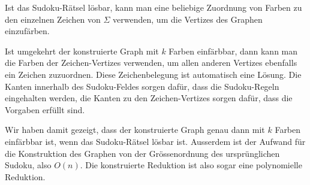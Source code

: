 \begin{loesung}
Ist das Sudoku-Rätsel lösbar, kann man eine beliebige
Zuordnung von Farben zu den einzelnen Zeichen von $\Sigma$ verwenden,
um die Vertizes des Graphen einzufärben. 

Ist umgekehrt der konstruierte Graph mit $k$ Farben einfärbbar, dann kann man
die Farben der Zeichen-Vertizes verwenden, um allen anderen Vertizes
ebenfalls ein Zeichen zuzuordnen. Diese Zeichenbelegung ist automatisch
eine Lösung. Die Kanten innerhalb des Sudoku-Feldes sorgen dafür, dass
die Sudoku-Regeln eingehalten werden, die Kanten zu den Zeichen-Vertizes
sorgen dafür, dass die Vorgaben erfüllt sind.

Wir haben damit gezeigt, dass der konstruierte Graph genau dann mit
$k$ Farben einfärbbar ist, wenn das Sudoku-Rätsel lösbar ist. 
Ausserdem ist der Aufwand für die Konstruktion des Graphen von der
Grössenordnung des ursprünglichen Sudoku, also $O(n)$. Die konstruierte
Reduktion ist also sogar eine polynomielle Reduktion.
\end{loesung}


